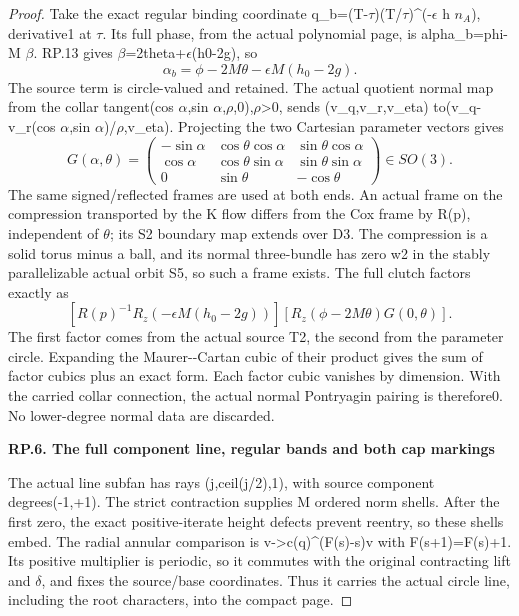\begin{proof}
Take the exact regular binding coordinate
q\_b=(T-\(\tau\))(T/\(\tau\))\^{}(-\(\epsilon\) h \(n_A\)), derivative1 at \(\tau\). Its full
phase, from the actual polynomial page, is alpha\_b=phi-M \(\beta\).
RP.13 gives \(\beta\)=2theta+\(\epsilon\)(h0-2g), so
\[
\alpha_b=\phi-2M\theta-\epsilon M(h_0-2g).
\tag{RP.16}
\]
The source term is circle-valued and retained. The actual quotient
normal map from the collar tangent(cos \(\alpha\),sin \(\alpha\),\(\rho\),0),\(\rho\)\textgreater0,
sends (v\_q,v\_r,v\_eta) to(v\_q-v\_r(cos \(\alpha\),sin \(\alpha\))/\(\rho\),v\_eta).
Projecting the two Cartesian parameter vectors gives
\[
G(\alpha,\theta)=\begin{pmatrix}
-\sin\alpha&\cos\theta\cos\alpha&\sin\theta\cos\alpha\\
\cos\alpha&\cos\theta\sin\alpha&\sin\theta\sin\alpha\\
0&\sin\theta&-\cos\theta
\end{pmatrix}\in SO(3).
\tag{RP.17}
\]
The same signed/reflected frames are used at both ends. An actual
frame on the compression transported by the K flow differs from the
Cox frame by R(p), independent of \(\theta\); its S2 boundary map extends
over D3. The compression is a solid torus minus a ball, and its normal
three-bundle has zero w2 in the stably parallelizable actual orbit S5,
so such a frame exists. The full clutch factors exactly as
\[
[R(p)^{-1}R_z(-\epsilon M(h_0-2g))]
       [R_z(\phi-2M\theta)G(0,\theta)].\tag{RP.18}
\]
The first factor comes from the actual source T2, the second from
the parameter circle. Expanding the Maurer-\/-Cartan cubic of their
product gives the sum of factor cubics plus an exact form. Each
factor cubic vanishes by dimension. With the carried collar connection,
the actual normal Pontryagin pairing is therefore0. No lower-degree
normal data are discarded.

\par

\medskip\noindent\textbf{RP.6. The full component line, regular bands and both cap markings}

\par\nobreak

The actual line subfan has rays (j,ceil(j/2),1), with source component
degrees(-1,+1). The strict contraction supplies M ordered norm shells.
After the first zero, the exact positive-iterate height defects prevent
reentry, so these shells embed. The radial annular comparison is
v-\textgreater c(q)\^{}(F(s)-s)v with F(s+1)=F(s)+1. Its positive multiplier is
periodic, so it commutes with the original contracting lift and \(\delta\),
and fixes the source/base coordinates. Thus it carries the actual
circle line, including the root characters, into the compact page.


\end{proof}
